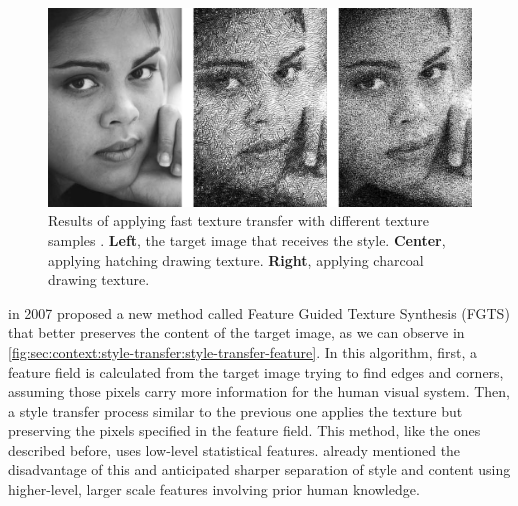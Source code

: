 \begin{figure}[htbp]
  \includegraphics[width=\textwidth]{gfx/style-transfer-fast-texture}
  \caption{
    Results of applying fast texture transfer with different texture samples \cite{Ashikhmin2003}.
    \textbf{Left}, the target image that receives the style.
    \textbf{Center}, applying hatching drawing texture.
    \textbf{Right}, applying charcoal drawing texture.
  }
  \label{fig:sec:context:style-transfer:style-transfer-analogy}
\end{figure}

\citet{Xie2007} in 2007 proposed a new method called Feature Guided Texture Synthesis (FGTS) that better preserves the content of the target image, as we can observe in \autoref{fig:sec:context:style-transfer:style-transfer-feature}.
In this algorithm, first, a feature field is calculated from the target image trying to find edges and corners, assuming those pixels carry more information for the human visual system.
Then, a style transfer process similar to the previous one applies the texture but preserving the pixels specified in the feature field.
This method, like the ones described before, uses low-level statistical features.
\citeauthor{Xie2007} already mentioned the disadvantage of this and anticipated sharper separation of style and content using higher-level, larger scale features involving prior human knowledge.


